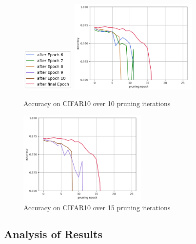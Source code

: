 \begin{figure}
	\begin{minipage}{\textwidth}
		\centering
		\includegraphics[width=100px]{gfx/7-Evaluation/LTH_6_legend.png}
	\end{minipage}
	\begin{minipage}{0.5\textwidth}
		\centering
		\includegraphics[height=175px]{gfx/Experiments/EarlyTicket-MNIST-FCN/678.png}
		\caption*{Accuracy on CIFAR10 over 10 pruning iterations}
		\label{?}
	\end{minipage}\hfill
	\begin{minipage}{0.5\textwidth}
		\centering
		\includegraphics[height=175px]{gfx/Experiments/EarlyTicket-MNIST-FCN/910.png}
		\caption*{Accuracy on CIFAR10 over 15 pruning iterations}
		\label{?}
	\end{minipage}
\end{figure}
\subsection*{Analysis of Results}
